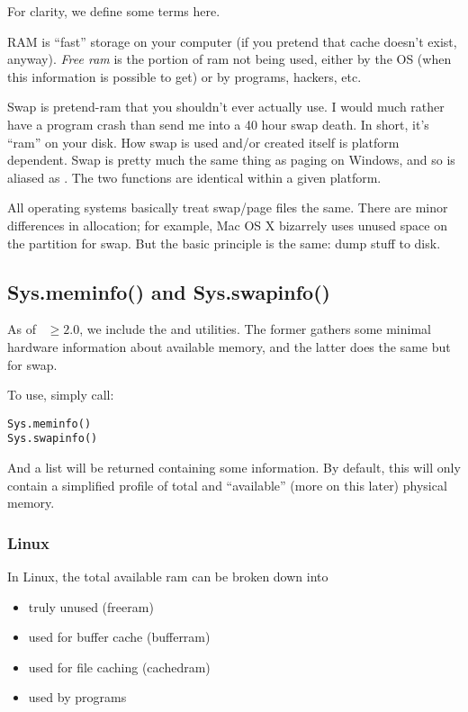 For clarity, we define some terms here.

RAM is ``fast'' storage on your computer (if you pretend that cache doesn't 
exist, anyway).  \emph{Free ram} is the portion of ram not being used, either 
by the OS (when this information is possible to get) or by programs, hackers, 
etc.

Swap is pretend-ram that you shouldn't ever actually use.  I would much
rather have a program crash than send me into a 40 hour swap death.  In 
short, it's ``ram'' on your disk.  How swap is used and/or created itself is 
platform dependent.  Swap is pretty much the same thing as paging on 
Windows, and so  is aliased as .  The 
two functions are identical within a given platform.

All operating systems basically treat swap/page files the same.  There are minor 
differences in allocation; for example, Mac OS X bizarrely uses unused space on 
the  partition for swap.  But the basic principle is the same: dump 
stuff to disk.



\subsection{Sys.meminfo() and Sys.swapinfo()}

As of ~$\geq 2.0$, we include the  and 
 utilities.  The former gathers some minimal 
hardware information about available memory, and the latter does the same but 
for swap.

To use, simply call:
\begin{lstlisting}
Sys.meminfo()
Sys.swapinfo()
\end{lstlisting}

And a list will be returned containing some information.  By default, this will 
only contain a simplified profile of total and ``available'' (more on this 
later) physical memory. 





\subsubsection{Linux}
In Linux, the total available ram can be broken down into
\begin{itemize}
  \item truly unused (freeram)
  \item used for buffer cache (bufferram)
  \item used for file caching (cachedram)
  \item used by programs
\end{itemize}

